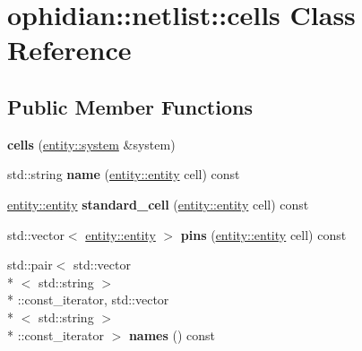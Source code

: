 \hypertarget{classophidian_1_1netlist_1_1cells}{\section{ophidian\-:\-:netlist\-:\-:cells Class Reference}
\label{classophidian_1_1netlist_1_1cells}
}
\subsection*{Public Member Functions}
\begin{DoxyCompactItemize}
\item 
\hypertarget{classophidian_1_1netlist_1_1cells_a82416c4389626e0da9c1d1b552d75239}{{\bfseries cells} (\hyperlink{classophidian_1_1entity_1_1system}{entity\-::system} \&system)}\label{classophidian_1_1netlist_1_1cells_a82416c4389626e0da9c1d1b552d75239}

\item 
\hypertarget{classophidian_1_1netlist_1_1cells_a7c8a0122dc2a83f716dcbb3104f1b0bd}{std\-::string {\bfseries name} (\hyperlink{classophidian_1_1entity_1_1entity}{entity\-::entity} cell) const }\label{classophidian_1_1netlist_1_1cells_a7c8a0122dc2a83f716dcbb3104f1b0bd}

\item 
\hypertarget{classophidian_1_1netlist_1_1cells_a5db22ac0244f1ff476e94c961e9e6635}{\hyperlink{classophidian_1_1entity_1_1entity}{entity\-::entity} {\bfseries standard\-\_\-cell} (\hyperlink{classophidian_1_1entity_1_1entity}{entity\-::entity} cell) const }\label{classophidian_1_1netlist_1_1cells_a5db22ac0244f1ff476e94c961e9e6635}

\item 
\hypertarget{classophidian_1_1netlist_1_1cells_abf871a594b9a8a2446dc41b8f7691575}{std\-::vector$<$ \hyperlink{classophidian_1_1entity_1_1entity}{entity\-::entity} $>$ {\bfseries pins} (\hyperlink{classophidian_1_1entity_1_1entity}{entity\-::entity} cell) const }\label{classophidian_1_1netlist_1_1cells_abf871a594b9a8a2446dc41b8f7691575}

\item 
\hypertarget{classophidian_1_1netlist_1_1cells_a208e79802cea975c583ca4d17abae3f1}{std\-::pair$<$ std\-::vector\\*
$<$ std\-::string $>$\\*
\-::const\-\_\-iterator, std\-::vector\\*
$<$ std\-::string $>$\\*
\-::const\-\_\-iterator $>$ {\bfseries names} () const }\label{classophidian_1_1netlist_1_1cells_a208e79802cea975c583ca4d17abae3f1}


\end{DoxyCompactItemize}
